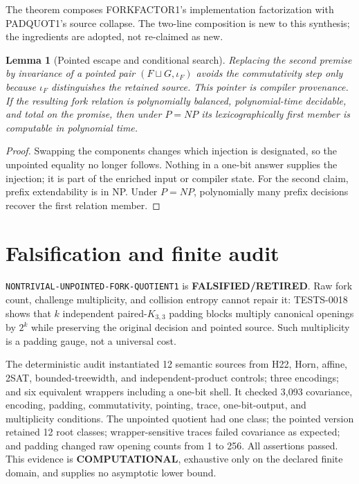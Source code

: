\documentclass[11pt]{article}
\newtheorem{lemma}{Lemma}
\newcommand{\COMP}{\textbf{COMPUTATIONAL}}
\newcommand{\RETIRED}{\textbf{FALSIFIED/RETIRED}}
\begin{document}
The theorem composes FORKFACTOR1's implementation factorization with
PADQUOT1's source collapse.  The two-line composition is new to this
synthesis; the ingredients are adopted, not re-claimed as new.

\begin{lemma}[Pointed escape and conditional search]
Replacing the second premise by invariance of a pointed pair
\((F\sqcup G,\iota_F)\) avoids the commutativity step only because
\(\iota_F\) distinguishes the retained source.  This pointer is compiler
provenance.  If the resulting fork relation is polynomially balanced,
polynomial-time decidable, and total on the promise, then under \(P=NP\) its
lexicographically first member is computable in polynomial time.
\end{lemma}
\begin{proof}
Swapping the components changes which injection is designated, so the
unpointed equality no longer follows.  Nothing in a one-bit answer supplies
the injection; it is part of the enriched input or compiler state.  For the
second claim, prefix extendability is in NP.  Under \(P=NP\), polynomially
many prefix decisions recover the first relation member.
\end{proof}

\section{Falsification and finite audit}
\texttt{NONTRIVIAL-UNPOINTED-FORK-QUOTIENT1} is \RETIRED.  Raw fork count,
challenge multiplicity, and collision entropy cannot repair it: TESTS-0018
shows that \(k\) independent paired-\(K_{3,3}\) padding blocks multiply
canonical openings by \(2^k\) while preserving the original decision and
pointed source.  Such multiplicity is a padding gauge, not a universal cost.

The deterministic audit instantiated 12 semantic sources from H22, Horn,
affine, 2SAT, bounded-treewidth, and independent-product controls; three
encodings; and six equivalent wrappers including a one-bit shell.  It checked
3,093 covariance, encoding, padding, commutativity, pointing, trace,
one-bit-output, and multiplicity conditions.  The unpointed quotient had one
class; the pointed version retained 12 root classes; wrapper-sensitive traces
failed covariance as expected; and padding changed raw opening counts from
1 to 256.  All assertions passed.  This evidence is \COMP, exhaustive only
on the declared finite domain, and supplies no asymptotic lower bound.
\end{document}

